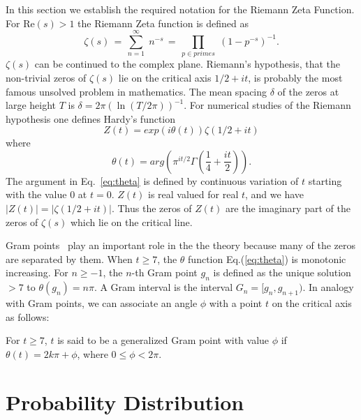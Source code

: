 \documentclass[twoside]{article}
\begin{document}
In this section we  establish the required notation for the 
Riemann Zeta Function. 
For $\mathrm{Re} (s) > 1$ the Riemann Zeta function is defined as
\begin{equation}
\zeta ( s ) \, = \, \sum^{\infty}_{n = 1} \; n^{-s} \, = \, \prod_{p \in primes} \;
\left( 1 - p^{-s} \right)^{-1}.
\label{eqRie}
\end{equation}
 $\zeta ( s )$ can be continued to
the complex plane. Riemann's hypothesis, that the non-trivial zeros of $\zeta ( s )$ lie on the 
critical axis $1/2+it$, is probably the most famous unsolved problem in mathematics.
The mean spacing $\delta$ of the zeros  at large height $T$ is $\delta = 2\pi(\ln (T/2\pi))^{-1}$. 
For numerical studies of the Riemann hypothesis one defines Hardy's function
\begin{equation}
Z(t)=exp(i\theta(t))\zeta(1/2 +it) 
\label{eq:hardy}
\end{equation}
where 
\begin{equation}
\theta(t) = arg (\pi^{it/2} \Gamma(\frac{1}{4} + \frac{it}{2})). 
\label{eq:theta}
\end{equation}
The argument in Eq.~\ref{eq:theta} is defined by continuous variation of $t$ starting with the value $0$ at $t = 0$.
$Z(t)$ is real valued for real $t$,
and we have $|Z(t)| = |\zeta(1/2+it)|$. Thus the zeros of $Z(t)$ are the imaginary part of the zeros 
of $\zeta(s)$ which lie on the critical line.  

Gram points~\cite{Gram 1903} play an important role in the the theory because many of the zeros are separated by them.  When $t \ge 7$, the $\theta$ function Eq.(\ref{eq:theta}) is monotonic increasing. 
For $n \ge -1$, the $n$-th Gram point $g_n$ is defined as the unique solution $> 7$ to
$\theta (g_n) = n\pi$. A Gram interval is the interval $G_n = [g_n,g_{n+1})$.
 In analogy with Gram points, we can associate an angle $\phi$ with a point $t$ on the critical axis as follows:
\begin{definition}\label{phi}
For $t \ge 7$, $t$ is said to be a generalized Gram point with value $\phi$  if
$\theta (t) = 2k\pi + \phi$, where $0 \le \phi < 2\pi$.
\end{definition}



\section{\label{sec3}Probability Distribution}
\end{document}
